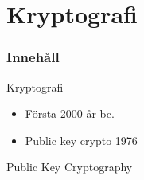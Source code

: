 \section{Kryptografi}
\begin{frame}
\frametitle{Innehåll}
\tableofcontents[currentsection]
\end{frame}

\begin{frame}{Kryptografi}

\begin{itemize}
\item Första 2000 år bc.
\item Public key crypto 1976
\end{itemize}


\begin{center}
\end{center}


\end{frame}

\begin{frame}{Public Key Cryptography}


\begin{center}
\end{center}

\end{frame}

